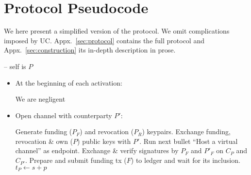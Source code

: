 \section{Protocol Pseudocode}
\label{sec:pseudocode}

We here present a simplified version of the protocol. We omit
complications imposed by UC. Appx.~\ref{sec:protocol} contains
the full protocol and Appx.~\ref{sec:construction} its in-depth
description in prose.
\ \\

\begin{center}
  \begin{processbox}{\pchan -- self is $P$}
    \begin{itemize}
      \item At the beginning of each activation:
      \begin{algorithmic}[0]
          \State We are negligent 
        \EndIf
      \end{algorithmic}

      \item Open channel with counterparty $P'$: 
      \begin{algorithmic}[0]
        \State Generate funding ($P_F$) and revocation ($P_R$) keypairs.
        \State Exchange funding, revocation \& own ($P$) public keys with $P'$.
          \State Run next bullet ``Host a virtual channel'' as endpoint.
        \EndIf
        \State Exchange \& verify signatures by $P_F$ and $P'_F$ on
        $C_P$ and $C_{P'}$.
          \State Prepare and submit funding tx ($F$) to ledger and wait for
          its inclusion. 
          \State $t_P \gets s + p$ 
          \State {}
        \EndIf
      \end{algorithmic}


\end{itemize}
\end{processbox}
\end{center}
